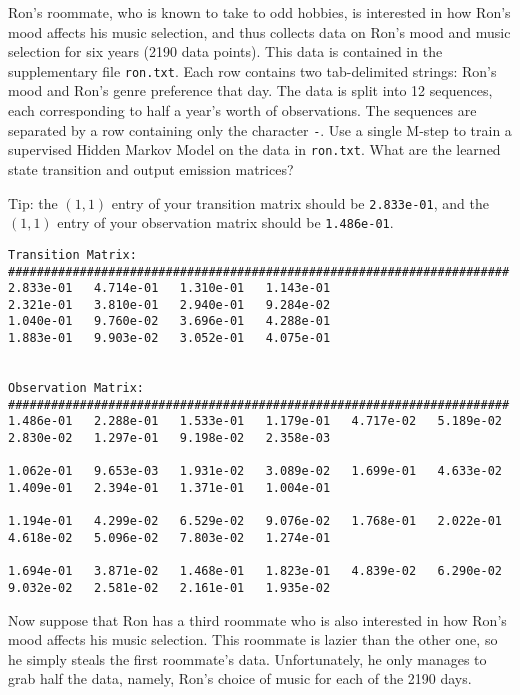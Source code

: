 Ron's roommate, who is known to take to odd hobbies, is interested in how Ron's mood affects his music selection, and thus collects data on Ron's mood and music selection for six years (2190 data points). This data is contained in the supplementary file \texttt{ron.txt}. Each row contains two tab-delimited strings: Ron's mood and Ron's genre preference that day. The data is split into 12 sequences, each corresponding to half a year's worth of observations. The sequences are separated by a row containing only the character \texttt{-}.
\newpage
\problem[10] %
Use a single M-step to train a supervised Hidden Markov Model on the data in \texttt{ron.txt}. What are the learned state transition and output emission matrices?

Tip: the \((1,1)\) entry of your transition matrix should be \verb|2.833e-01|, and the \((1,1)\) entry of your observation matrix should be \verb|1.486e-01|.
\begin{solution}

\begin{verbatim}
Transition Matrix:
######################################################################
2.833e-01   4.714e-01   1.310e-01   1.143e-01   
2.321e-01   3.810e-01   2.940e-01   9.284e-02   
1.040e-01   9.760e-02   3.696e-01   4.288e-01   
1.883e-01   9.903e-02   3.052e-01   4.075e-01   


Observation Matrix:  
######################################################################
1.486e-01   2.288e-01   1.533e-01   1.179e-01   4.717e-02   5.189e-02
2.830e-02   1.297e-01   9.198e-02   2.358e-03

1.062e-01   9.653e-03   1.931e-02   3.089e-02   1.699e-01   4.633e-02
1.409e-01   2.394e-01   1.371e-01   1.004e-01

1.194e-01   4.299e-02   6.529e-02   9.076e-02   1.768e-01   2.022e-01
4.618e-02   5.096e-02   7.803e-02   1.274e-01

1.694e-01   3.871e-02   1.468e-01   1.823e-01   4.839e-02   6.290e-02
9.032e-02   2.581e-02   2.161e-01   1.935e-02 
\end{verbatim}
\end{solution}
\newpage
\problem[15] %
Now suppose that Ron has a third roommate who is also interested in how Ron's mood affects his music selection. This roommate is lazier than the other one, so he simply steals the first roommate's data. Unfortunately, he only manages to grab half the data, namely, Ron's choice of music for each of the 2190 days.

